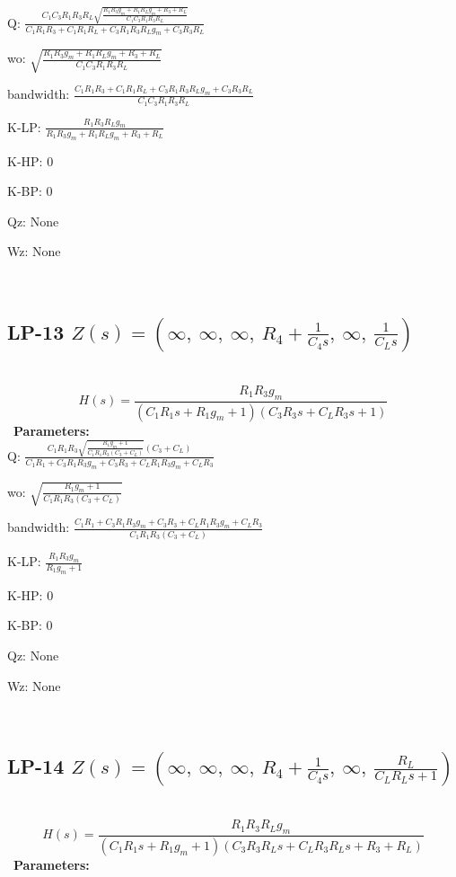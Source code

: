 \documentclass{article}
\begin{document}
Q: $\frac{C_{1} C_{3} R_{1} R_{3} R_{L} \sqrt{\frac{R_{1} R_{3} g_{m} + R_{1} R_{L} g_{m} + R_{3} + R_{L}}{C_{1} C_{3} R_{1} R_{3} R_{L}}}}{C_{1} R_{1} R_{3} + C_{1} R_{1} R_{L} + C_{3} R_{1} R_{3} R_{L} g_{m} + C_{3} R_{3} R_{L}}$\ 

wo: $\sqrt{\frac{R_{1} R_{3} g_{m} + R_{1} R_{L} g_{m} + R_{3} + R_{L}}{C_{1} C_{3} R_{1} R_{3} R_{L}}}$\ 

bandwidth: $\frac{C_{1} R_{1} R_{3} + C_{1} R_{1} R_{L} + C_{3} R_{1} R_{3} R_{L} g_{m} + C_{3} R_{3} R_{L}}{C_{1} C_{3} R_{1} R_{3} R_{L}}$\ 

K-LP: $\frac{R_{1} R_{3} R_{L} g_{m}}{R_{1} R_{3} g_{m} + R_{1} R_{L} g_{m} + R_{3} + R_{L}}$\ 

K-HP: $0$\ 

K-BP: $0$\ 

Qz: $\text{None}$\ 

Wz: $\text{None}$\ 

\ 

\subsection{LP-13 $Z(s) = \left( \infty, \  \infty, \  \infty, \  R_{4} + \frac{1}{C_{4} s}, \  \infty, \  \frac{1}{C_{L} s}\right)$ } \ 
\textbf{\[H(s) = \frac{R_{1} R_{3} g_{m}}{\left(C_{1} R_{1} s + R_{1} g_{m} + 1\right) \left(C_{3} R_{3} s + C_{L} R_{3} s + 1\right)}\] } \ 
\textbf{Parameters:}\\ 

Q: $\frac{C_{1} R_{1} R_{3} \sqrt{\frac{R_{1} g_{m} + 1}{C_{1} R_{1} R_{3} \left(C_{3} + C_{L}\right)}} \left(C_{3} + C_{L}\right)}{C_{1} R_{1} + C_{3} R_{1} R_{3} g_{m} + C_{3} R_{3} + C_{L} R_{1} R_{3} g_{m} + C_{L} R_{3}}$\ 

wo: $\sqrt{\frac{R_{1} g_{m} + 1}{C_{1} R_{1} R_{3} \left(C_{3} + C_{L}\right)}}$\ 

bandwidth: $\frac{C_{1} R_{1} + C_{3} R_{1} R_{3} g_{m} + C_{3} R_{3} + C_{L} R_{1} R_{3} g_{m} + C_{L} R_{3}}{C_{1} R_{1} R_{3} \left(C_{3} + C_{L}\right)}$\ 

K-LP: $\frac{R_{1} R_{3} g_{m}}{R_{1} g_{m} + 1}$\ 

K-HP: $0$\ 

K-BP: $0$\ 

Qz: $\text{None}$\ 

Wz: $\text{None}$\ 

\ 

\subsection{LP-14 $Z(s) = \left( \infty, \  \infty, \  \infty, \  R_{4} + \frac{1}{C_{4} s}, \  \infty, \  \frac{R_{L}}{C_{L} R_{L} s + 1}\right)$ } \ 
\textbf{\[H(s) = \frac{R_{1} R_{3} R_{L} g_{m}}{\left(C_{1} R_{1} s + R_{1} g_{m} + 1\right) \left(C_{3} R_{3} R_{L} s + C_{L} R_{3} R_{L} s + R_{3} + R_{L}\right)}\] } \ 
\textbf{Parameters:}\\ 
\end{document}
